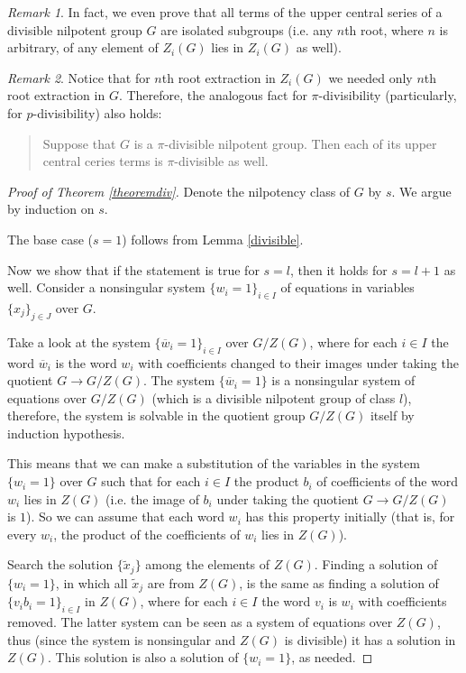 \documentclass{article}
\theoremstyle{definition}
\theoremstyle{remark}
\newtheorem*{rem}{Remark}
\let\tilde\widetilde
\begin{document}
\begin{rem}
In fact, we even prove that all terms of the upper central series
of a divisible nilpotent group $G$ are isolated subgroups
(i.e. any $n$th root, where $n$ is arbitrary, of any element of $Z_i(G)$
lies in $Z_i(G)$ as well).
\end{rem}

\begin{rem}
Notice that for $n$th root extraction in $Z_i(G)$
we needed only $n$th root extraction in $G$.
Therefore, the analogous fact for $\pi$-divisibility
(particularly, for $p$-divisibility) also holds:
\begin{quote}
Suppose that $G$ is a $\pi$-divisible nilpotent group.
Then each of its upper central ceries terms is
$\pi$-divisible as well.
\end{quote}
\end{rem}

\begin{proof}[Proof of Theorem \ref{theoremdiv}]
Denote the nilpotency class of $G$ by $s$.
We argue by induction on $s$.

The base case ($s=1$) follows from Lemma \ref{divisible}.

Now we show that if the statement is true for
$s=l$,
then it holds for $s=l+1$ as well.
Consider a nonsingular system $\{w_i=1\}_{i\in I}$
of equations in variables $\{x_j\}_{j \in J}$ over $G$.

Take a look at the system $\{\overline{w}_i=1\}_{i\in I}$ over $G/Z(G)$,
where for each $i \in I$ the word $\overline{w}_i$ is
the word $w_i$ with coefficients changed to their images
under taking the quotient $G \to G/Z(G)$.
The system $\{\overline{w}_i=1\}$ is a nonsingular system of equations
over $G/Z(G)$ (which is a divisible nilpotent group of class $l$),
therefore, the system is solvable in the quotient group
$G/Z(G)$ itself by induction hypothesis.

This means that we can make a substitution of the variables
in the system $\{w_i=1\}$ over $G$
such that for each $i \in I$ the product $b_i$ of coefficients of the word $w_i$
lies in $Z(G)$
(i.e. the image of $b_i$ under taking the quotient $G \to G/Z(G)$ is $1$).
So we can assume that each word $w_i$ has this property initially
(that is, for every $w_i$, the product of the coefficients of $w_i$ lies in $Z(G)$).

Search the solution $\{\tilde x_j\}$ among the elements of $Z(G)$.
Finding a solution of $\{w_i=1\}$, in which all $\tilde x_j$ are
from $Z(G)$, is the same as finding a solution of $\{v_ib_i=1\}_{i \in I}$
in $Z(G)$, where for each $i \in I$ the word $v_i$ is $w_i$ with coefficients removed.
The latter system can be seen as a system of equations over $Z(G)$,
thus (since the system is nonsingular and $Z(G)$ is divisible)
it has a solution in $Z(G)$.
This solution is also a solution of $\{w_i=1\}$, as needed.
\end{proof}
\end{document}
